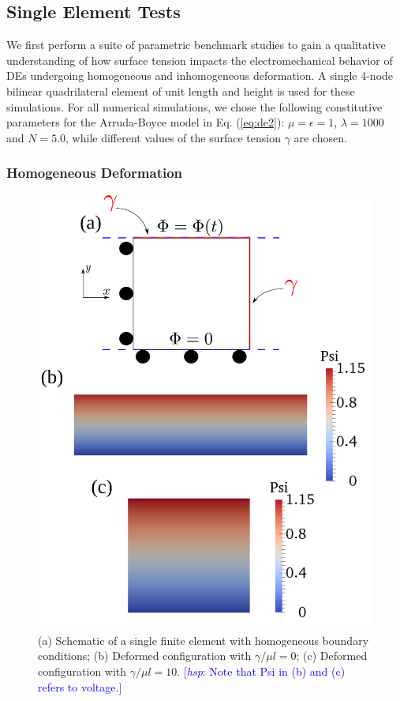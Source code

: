 \documentclass[8.5pt,twoside,twocolumn]{article}
\newcommand{\hsp}[1]{\textcolor{blue}{[\textit{hsp}: #1]}}
\begin{document}
\subsection{Single Element Tests}

We first perform a suite of parametric benchmark studies to gain a qualitative understanding of how surface tension impacts the electromechanical behavior of DEs undergoing homogeneous and inhomogeneous deformation.  A single 4-node bilinear quadrilateral element of unit length and height is used for these simulations.  For all numerical simulations, we chose the following constitutive parameters for the Arruda-Boyce model in Eq. (\ref{eq:de2}):  $\mu=\epsilon=1$, $\lambda=1000$ and $N=5.0$, while different values of the surface tension $\gamma$ are chosen. 

\subsubsection{Homogeneous Deformation}

\begin{figure} \begin{center} 
\includegraphics[scale=0.28]{pics/homo3.pdf}
\caption{(a) Schematic of a single finite element with homogeneous boundary conditions; (b) Deformed configuration with $\gamma/\mu l=0$; (c) Deformed configuration with $\gamma/\mu l=10$.  \hsp{Note that Psi in (b) and (c) refers to voltage.}}
\label{homo3} \end{center} \end{figure}
\end{document}
